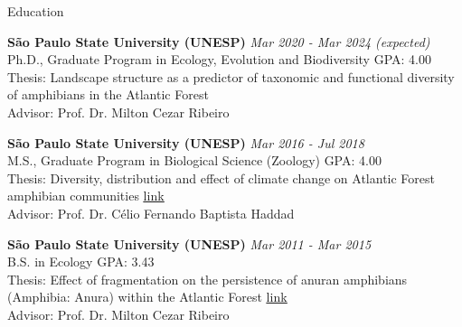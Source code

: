 \documentclass{resume}
\begin{document}
\begin{rSection}{Education}

{\bf São Paulo State University (UNESP)} \hfill {\em Mar 2020 - Mar 2024 (expected)} 
\\ Ph.D., Graduate Program in Ecology, Evolution and Biodiversity \hfill { GPA: 4.00 } 
\\ Thesis: Landscape structure as a predictor of taxonomic and functional diversity of amphibians in the Atlantic Forest \\ Advisor: Prof. Dr. Milton Cezar Ribeiro

{\bf São Paulo State University (UNESP)} \hfill {\em Mar 2016 - Jul 2018} 
\\ M.S., Graduate Program in Biological Science (Zoology)\hfill { GPA: 4.00 } 
\\ Thesis: Diversity, distribution and effect of climate change on Atlantic Forest amphibian communities \href{https://repositorio.unesp.br/handle/11449/154993}{\underline{link}} 
\\ Advisor: Prof. Dr. Célio Fernando Baptista Haddad

{\bf São Paulo State University (UNESP)} \hfill {\em Mar 2011 - Mar 2015} 
\\ B.S. in Ecology\hfill { GPA: 3.43 } 
\\ Thesis: Effect of fragmentation on the persistence of anuran amphibians (Amphibia: Anura) within the Atlantic Forest \href{https://repositorio.unesp.br/handle/11449/138991}{\underline{link}} 
\\ Advisor: Prof. Dr. Milton Cezar Ribeiro

\end{rSection}

\end{document}
